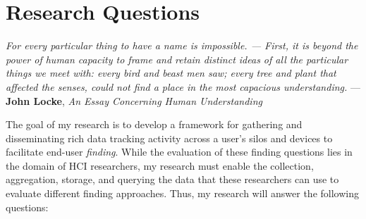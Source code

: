 \chapter{Research Questions}
\label{ch:research-questions}

\begin{epigraph}
    \textit{For every particular thing to have a name is impossible. --- First,
        it is beyond the power of human capacity to frame and retain distinct
        ideas of all the particular things we meet with: every bird and beast men
        saw; every tree and plant that affected the senses, could not find a place
        in the most capacious understanding.} --- \textbf{John Locke}, \textit{An Essay
        Concerning Human Understanding}~\cite{locke1844locke}
\end{epigraph}

The goal of my research is to develop a framework for gathering and
disseminating rich data tracking activity across a user's silos and devices to
facilitate end-user \emph{finding}.  While the evaluation of these finding
questions lies in the domain of HCI researchers, my research must enable
the collection, aggregation, storage, and querying the data that these
researchers can use to evaluate different finding approaches.  Thus, my research
will answer the following questions:

